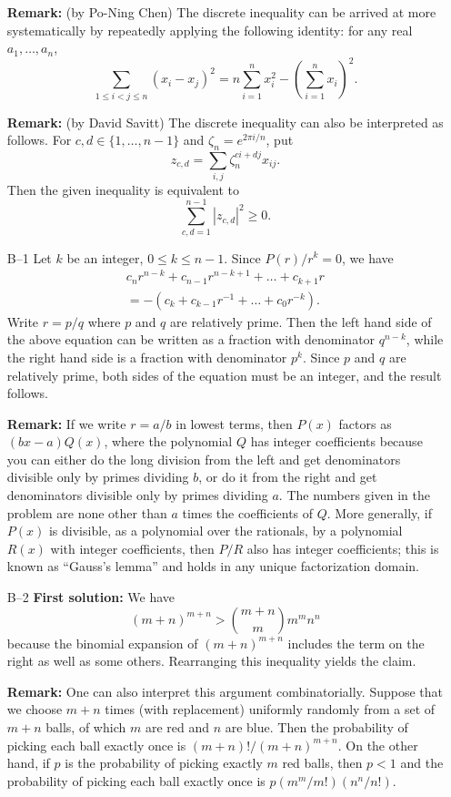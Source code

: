 \documentclass[amssymb,twocolumn,pra,10pt,aps]{revtex4-1}
\begin{document}
\begin{itemize}
\textbf{Remark:} (by Po-Ning Chen)
The discrete inequality can be arrived at more systematically
by repeatedly applying the following identity: for
any real $a_1, \dots, a_n$,
\[
\sum_{1 \leq i < j \leq n} (x_i - x_j)^2
= n \sum_{i=1}^n x_i^2 - \left( \sum_{i=1}^n x_i \right)^2.
\]

\textbf{Remark:} (by David Savitt)
The discrete inequality can also be interpreted as follows.
For $c,d \in \{1, \dots, n-1\}$ and $\zeta_n = e^{2\pi i/n}$, put
\[
z_{c,d} = \sum_{i,j} \zeta_n^{c i + d j} x_{ij}.
\]
Then the given inequality is equivalent to
\[
\sum_{c,d=1}^{n-1} |z_{c,d}|^2 \geq 0.
\]

\item[B--1]
Let $k$ be an integer, $0\leq k\leq n-1$. Since $P(r)/r^k = 0$, we
have
\begin{multline*}
c_n r^{n-k} + c_{n-1} r^{n-k+1} + \dots + c_{k+1} r \\
= - (c_k + c_{k-1} r^{-1} + \dots + c_0 r^{-k}).
\end{multline*}
Write $r = p/q$ where $p$ and $q$ are relatively prime. Then the
left hand side of the above equation can be written as a fraction
with denominator $q^{n-k}$, while the right hand side is a fraction
with denominator $p^k$. Since $p$ and $q$ are relatively prime, both
sides of the equation must be an integer, and the result follows.

\textbf{Remark:}
If we write $r = a/b$ in lowest terms, then $P(x)$ factors as $(bx-a)Q(x)$,
where the polynomial $Q$ has integer coefficients because you can
either do the long division from the left and get denominators divisible only
by primes dividing $b$, or do it from the right and get denominators
divisible only by primes dividing $a$. The numbers given in the problem
are none other than $a$ times the coefficients of $Q$.
More generally, if $P(x)$ is divisible,
as a polynomial over the rationals, by a polynomial $R(x)$ with integer
coefficients, then $P/R$ also has integer coefficients; this is known
as ``Gauss's lemma'' and holds in any unique factorization domain.

\item[B--2]
\textbf{First solution:}
We have
\[
(m+n)^{m+n} > \binom{m+n}{m} m^m n^n
\]
because the binomial expansion of $(m+n)^{m+n}$ includes the term on
the right as well as some others. Rearranging this inequality yields
the claim.

\textbf{Remark:}
One can also interpret this argument combinatorially.
Suppose that we choose $m+n$ times (with replacement) uniformly
randomly from a set of $m+n$ balls, of which $m$ are red and $n$ are
blue. Then the probability of picking each ball exactly once is
$(m+n)!/(m+n)^{m+n}$. On the other hand, if $p$ is the probability
of picking exactly $m$ red balls, then $p<1$ and the probability
of picking each ball exactly once is $p (m^m/m!)(n^n/n!)$.


\end{itemize}
\end{document}
